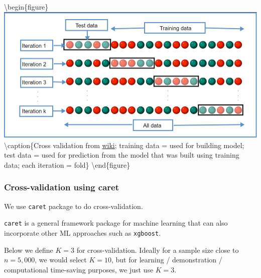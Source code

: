 \documentclass[
]{book}
\newenvironment{Shaded}{\begin{snugshade}}{\end{snugshade}}
\newcommand{\DecValTok}[1]{\textcolor[rgb]{0.00,0.00,0.81}{#1}}
\newcommand{\FunctionTok}[1]{\textcolor[rgb]{0.00,0.00,0.00}{#1}}
\newcommand{\NormalTok}[1]{#1}
\newcommand{\OtherTok}[1]{\textcolor[rgb]{0.56,0.35,0.01}{#1}}
\newcommand{\SpecialCharTok}[1]{\textcolor[rgb]{0.00,0.00,0.00}{#1}}
\begin{document}
\textbackslash begin\{figure\}
\includegraphics[width=650px]{images/CV} \textbackslash caption\{Cross validation from \href{https://en.wikipedia.org/wiki/Cross-validation_(statistics)}{wiki}; training data = used for building model; test data = used for prediction from the model that was built using training data; each iteration = fold\}\label{fig:cvpic}
\textbackslash end\{figure\}

\hypertarget{cross-validation-using-caret}{%
\subsubsection{Cross-validation using caret}\label{cross-validation-using-caret}}

We use \texttt{caret} package to do cross-validation.

\begin{rmdcomment}
\texttt{caret} is a general framework package for machine learning that
can also incorporate other ML approaches such as \texttt{xgboost}.
\end{rmdcomment}

\begin{Shaded}
\end{Shaded}

Below we define \(K = 3\) for cross-validation. Ideally for a sample size close to \(n=5,000\), we would select \(K=10\), but for learning / demonstration / computational time-saving purposes, we just use \(K = 3\).
\end{document}
